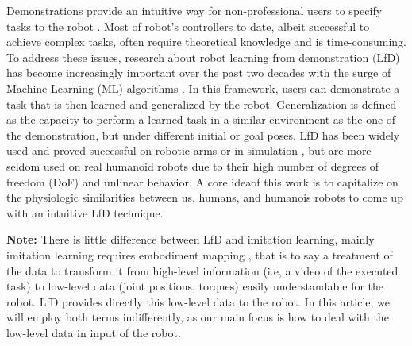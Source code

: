 \documentclass[conference]{IEEEtran}
\begin{document}
Demonstrations provide an intuitive way for non-professional users to specify tasks to the robot \cite{schaal_is_1999}. Most of robot's controllers to date, albeit successful to achieve complex tasks, often require theoretical knowledge and is time-consuming. To address these issues, research about robot learning from demonstration (LfD) has become increasingly important over the past two decades with the surge of Machine Learning (ML) algorithms \cite{argall_survey_2009} \cite{ravichandar_recent_2020}. In this framework, users can demonstrate a task that is then learned and generalized by the robot. Generalization is defined as the capacity to perform a learned task in a similar environment as the one of the demonstration, but under different initial or goal poses. LfD has been widely used and proved successful on robotic arms or in simulation \cite{pastor_learning_2009}, but are more seldom used on real humanoid robots \cite{calinon_learning_2007}due to their high number of degrees of freedom (DoF) and unlinear behavior. A core ideaof this work is to capitalize on the physiologic similarities between us, humans, and humanois robots to come up with an intuitive LfD technique.  

\textbf{Note:} There is little difference between LfD and imitation learning, mainly imitation learning requires embodiment mapping \cite{argall_survey_2009}, that is to say a treatment of the data to transform it from high-level information (i.e, a video of the executed task) to low-level data (joint positions, torques) easily understandable for the robot. LfD provides directly this low-level data to the robot. In this article, we will employ both terms indifferently, as our main focus is how to deal with the low-level data in input of the robot. \newline
\end{document}
